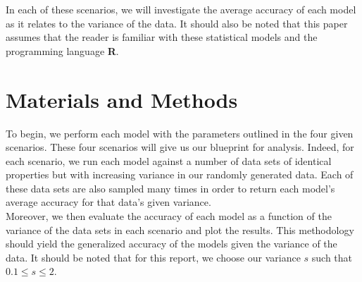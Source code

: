 \documentclass[11pt, oneside]{article}
\begin{document}
In each of these scenarios, we will investigate the average accuracy of each model as it relates to the variance of the data. It should also be noted that this paper assumes that the reader is familiar with these statistical models and the programming language \textbf\textsf{R}.

\pagebreak




\section{Materials and Methods}
To begin, we perform each model with the parameters outlined in the four given scenarios. These four scenarios will give us our blueprint for analysis. Indeed, for each scenario, we run each model against a number of data sets of identical properties but with increasing variance in our randomly generated data. Each of these data sets are also sampled many times in order to return each model's average accuracy for that data's given variance.\\
Moreover, we then evaluate the accuracy of each model as a function of the variance of the data sets in each scenario and plot the results. This methodology should yield the generalized accuracy of the models given the variance of the data. It should be noted that for this report, we choose our variance $s$ such that $0.1\leq s\leq 2$.\\

 
\end{document}

